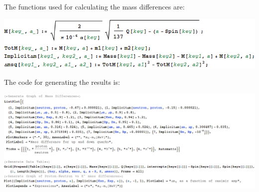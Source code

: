\documentclass[11pt,a4paper]{article}
\begin{document}
The functions used for calculating the mass differences are:

\includegraphics[width=\linewidth]{figures/MassDifferencesFunc}

The code for generating the results is:

\includegraphics[width=\linewidth]{figures/MassDifferencesCode}

%
%
\end{document}

